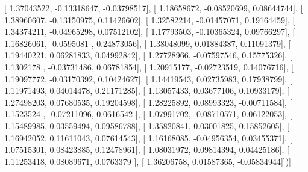 \documentclass{article}
\begin{document}
       [ 1.37043522, -0.13318647, -0.03798517],
       [ 1.18658672, -0.08520699,  0.08644744],
       [ 1.38960607, -0.13150975,  0.11426602],
       [ 1.32582214, -0.01457071,  0.19164459],
       [ 1.34374211, -0.04965298,  0.07512102],
       [ 1.17793503, -0.10365324,  0.09766297],
       [ 1.16826061, -0.0595081 ,  0.24873056],
       [ 1.38048099,  0.01884387,  0.11091379],
       [ 1.19440221,  0.06281833,  0.04992842],
       [ 1.27728966, -0.07597546,  0.15775326],
       [ 1.1302178 , -0.03731486,  0.06781854],
       [ 1.20915177, -0.02723519,  0.14076716],
       [ 1.19097772, -0.03170392,  0.10424627],
       [ 1.14419543,  0.02735983,  0.17938799],
       [ 1.11971493,  0.04014478,  0.21171285],
       [ 1.13057433,  0.03677106,  0.10933179],
       [ 1.27498203,  0.07680535,  0.19204598],
       [ 1.28225892,  0.08993323, -0.00711584],
       [ 1.1523524 , -0.07211096,  0.0616542 ],
       [ 1.07991702, -0.08710571,  0.06122053],
       [ 1.15489985,  0.03559494,  0.09586788],
       [ 1.35820841,  0.03001825,  0.15852605],
       [ 1.16942052,  0.11611043,  0.07614543],
       [ 1.16168085, -0.04956354,  0.03455371],
       [ 1.07515301,  0.08423885,  0.12478961],
       [ 1.08031972,  0.09814394,  0.04425186],
       [ 1.11253418,  0.08089671,  0.0763379 ],
       [ 1.36206758,  0.01587365, -0.05834944]])]
\end{document}
